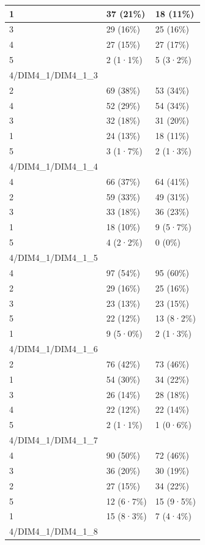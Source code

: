 \documentclass[
]{book}
\begin{document}
\begin{tabular}{l|l|l}
\hline
1 & 37 (21\%) & 18 (11\%)\\
\hline
3 & 29 (16\%) & 25 (16\%)\\
\hline
4 & 27 (15\%) & 27 (17\%)\\
\hline
5 & 2 (1·1\%) & 5 (3·2\%)\\
\hline
4/DIM4\_1/DIM4\_1\_3 &  & \\
\hline
2 & 69 (38\%) & 53 (34\%)\\
\hline
4 & 52 (29\%) & 54 (34\%)\\
\hline
3 & 32 (18\%) & 31 (20\%)\\
\hline
1 & 24 (13\%) & 18 (11\%)\\
\hline
5 & 3 (1·7\%) & 2 (1·3\%)\\
\hline
4/DIM4\_1/DIM4\_1\_4 &  & \\
\hline
4 & 66 (37\%) & 64 (41\%)\\
\hline
2 & 59 (33\%) & 49 (31\%)\\
\hline
3 & 33 (18\%) & 36 (23\%)\\
\hline
1 & 18 (10\%) & 9 (5·7\%)\\
\hline
5 & 4 (2·2\%) & 0 (0\%)\\
\hline
4/DIM4\_1/DIM4\_1\_5 &  & \\
\hline
4 & 97 (54\%) & 95 (60\%)\\
\hline
2 & 29 (16\%) & 25 (16\%)\\
\hline
3 & 23 (13\%) & 23 (15\%)\\
\hline
5 & 22 (12\%) & 13 (8·2\%)\\
\hline
1 & 9 (5·0\%) & 2 (1·3\%)\\
\hline
4/DIM4\_1/DIM4\_1\_6 &  & \\
\hline
2 & 76 (42\%) & 73 (46\%)\\
\hline
1 & 54 (30\%) & 34 (22\%)\\
\hline
3 & 26 (14\%) & 28 (18\%)\\
\hline
4 & 22 (12\%) & 22 (14\%)\\
\hline
5 & 2 (1·1\%) & 1 (0·6\%)\\
\hline
4/DIM4\_1/DIM4\_1\_7 &  & \\
\hline
4 & 90 (50\%) & 72 (46\%)\\
\hline
3 & 36 (20\%) & 30 (19\%)\\
\hline
2 & 27 (15\%) & 34 (22\%)\\
\hline
5 & 12 (6·7\%) & 15 (9·5\%)\\
\hline
1 & 15 (8·3\%) & 7 (4·4\%)\\
\hline
4/DIM4\_1/DIM4\_1\_8 &  & \\

\end{tabular}
\end{document}
